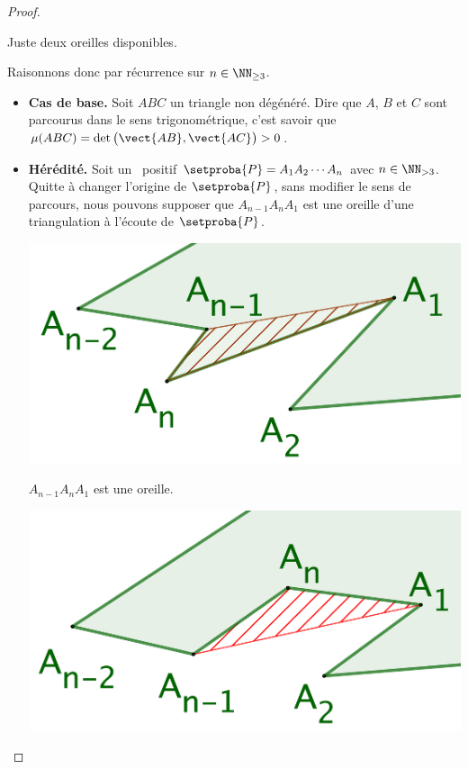 \begin{proof}
\begin{multicols}{2}
\begin{center}
            \smallskip
               Juste deux oreilles disponibles.
        \end{center}
    \end{multicols}


    Raisonnons donc par récurrence sur $n \in \NN_{\geq3}$.

    \begin{itemize}
        \item \textbf{Cas de base.}
        Soit $ABC$ un triangle non dégénéré.
        Dire que $A$, $B$ et $C$ sont parcourus dans le sens trigonométrique,
        c'est savoir que $\mu(ABC) = \det \big( \vect{AB} , \vect{AC} \big) > 0$.


        \item \textbf{Hérédité.}
        Soit un \ngone\ positif $\setproba{P} = A_1 A_2 \cdots A_n$ avec $n \in \NN_{>3}$.
        Quitte à changer l'origine de $\setproba{P}$, sans modifier le sens de parcours, nous pouvons supposer que $A_{n-1} A_n A_1$ est une oreille d'une triangulation à l'écoute de $\setproba{P}$.


        \begin{multicols}{2}
            \small\itshape
            \begin{center}
            \includegraphics[scale=.175]{triangulation-proof-OK.png}

                \smallskip
                   $A_{n-1} A_n A_1$ est une oreille.
        \end{center}

            \begin{center}
            \includegraphics[scale=.175]{triangulation-proof-KO.png}


\end{center}
\end{multicols}
\end{itemize}
\end{proof}
